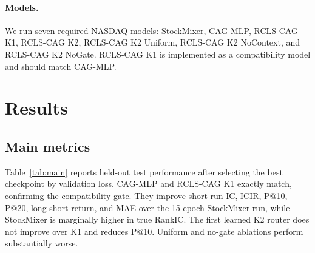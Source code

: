 \documentclass{article}
\begin{document}
\paragraph{Models.}
We run seven required NASDAQ models: StockMixer, CAG-MLP, RCLS-CAG K1, RCLS-CAG K2, RCLS-CAG K2 Uniform, RCLS-CAG K2 NoContext, and RCLS-CAG K2 NoGate. RCLS-CAG K1 is implemented as a compatibility model and should match CAG-MLP.

\section{Results}

\subsection{Main metrics}

Table~\ref{tab:main} reports held-out test performance after selecting the best checkpoint by validation loss. CAG-MLP and RCLS-CAG K1 exactly match, confirming the compatibility gate. They improve short-run IC, ICIR, P@10, P@20, long-short return, and MAE over the 15-epoch StockMixer run, while StockMixer is marginally higher in true RankIC. The first learned K2 router does not improve over K1 and reduces P@10. Uniform and no-gate ablations perform substantially worse.

\begin{table}[t]
\centering
\caption{NASDAQ 15-epoch seed-matched pilot. IC is Pearson; RankIC is Spearman; ICIR is mean(IC)/std(IC).}
\label{tab:main}
\end{table}
\end{document}
